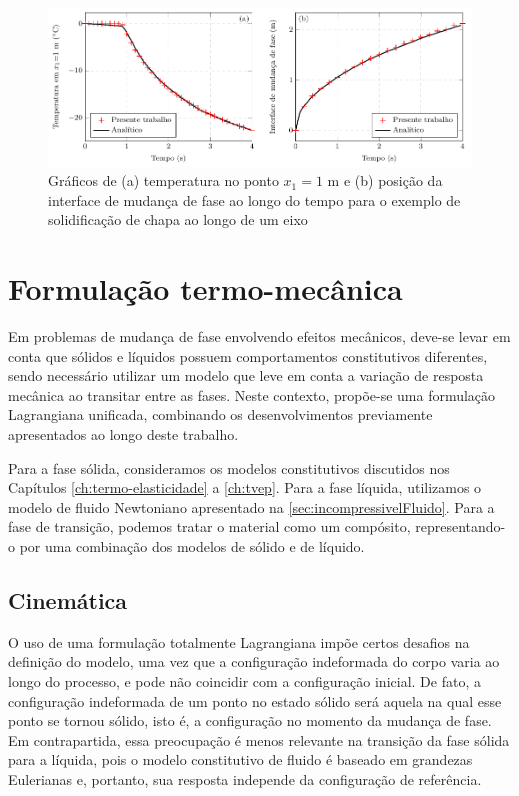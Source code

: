 \documentclass[Tese.tex]{subfiles}
\begin{document}
\begin{figure}[!htb]
	\centering
	\caption{Gráficos de (a) temperatura no ponto $x_1 = 1$ m e (b) posição da interface de mudança de fase ao longo do tempo para o exemplo de solidificação de chapa ao longo de um eixo}
	\label{fig:phaseChange0-1}
	\includegraphics[scale=1]{Figuras/PhaseChange0/PhaseChange0.pdf}
\end{figure}

\section{Formulação termo-mecânica}\label{sec:mudanca-de-fase-termo-mecanica}

Em problemas de mudança de fase envolvendo efeitos mecânicos, deve-se levar em conta que sólidos e líquidos possuem comportamentos constitutivos diferentes, sendo necessário utilizar um modelo que leve em conta a variação de resposta mecânica ao transitar entre as fases. Neste contexto, propõe-se uma formulação Lagrangiana unificada, combinando os desenvolvimentos previamente apresentados ao longo deste trabalho.

Para a fase sólida, consideramos os modelos constitutivos discutidos nos Capítulos \ref{ch:termo-elasticidade} a \ref{ch:tvep}. Para a fase líquida, utilizamos o modelo de fluido Newtoniano apresentado na \cref{sec:incompressivelFluido}. Para a fase de transição, podemos tratar o material como um compósito, representando-o por uma combinação dos modelos de sólido e de líquido.

\subsection{Cinemática}

O uso de uma formulação totalmente Lagrangiana impõe certos desafios na definição do modelo, uma vez que a configuração indeformada do corpo varia ao longo do processo, e pode não coincidir com a configuração inicial. De fato, a configuração indeformada de um ponto no estado sólido será aquela na qual esse ponto se tornou sólido, isto é, a configuração no momento da mudança de fase. Em contrapartida, essa preocupação é menos relevante na transição da fase sólida para a líquida, pois o modelo constitutivo de fluido é baseado em grandezas Eulerianas e, portanto, sua resposta independe da configuração de referência. 
\end{document}
